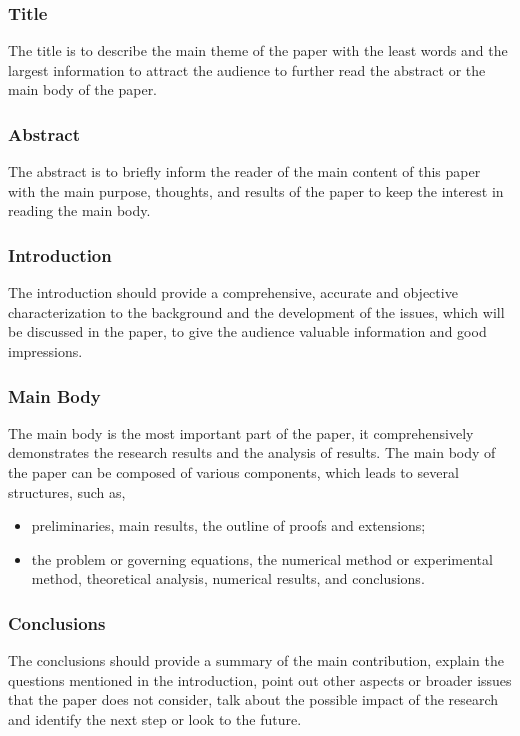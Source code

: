 \subsubsection{Title}
The title is to describe the main theme of the paper with the least words and the largest information to attract the audience to further read the abstract or the main body of the paper.

\subsubsection{Abstract}
The abstract is to briefly inform the reader of the main content of this paper with the main purpose, thoughts, and results of the paper to keep the interest in reading the main body.

\subsubsection{Introduction}
The introduction should provide a comprehensive, accurate and objective characterization to the background and the development of the issues, which will be discussed in the paper, to give the audience valuable information and good impressions.

\subsubsection{Main Body}
The main body is the most important part of the paper, it comprehensively demonstrates the research results and the analysis of results. The main body of the paper can be composed of various components, which leads to several structures, such as,
\begin{itemize}
	\item preliminaries, main results, the outline of proofs and extensions;
	\item the problem or governing equations, the numerical method or experimental method, theoretical analysis, numerical results, and conclusions.
\end{itemize}

\subsubsection{Conclusions}
The conclusions should provide a summary of the main contribution, explain the questions mentioned in the introduction, point out other aspects or broader issues that the paper does not consider, talk about the possible impact of the research and identify the next step or look to the future.

